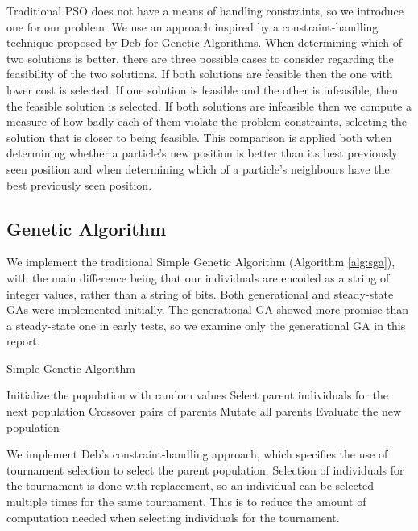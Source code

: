 \documentclass{sig-alternate}
\begin{document}
Traditional PSO does not have a means of handling constraints, so we introduce one for our problem. We use an approach inspired by a constraint-handling technique proposed by Deb for Genetic Algorithms\cite{Deb2000}. When determining which of two solutions is better, there are three possible cases to consider regarding the feasibility of the two solutions. If both solutions are feasible then the one with lower cost is selected. If one solution is feasible and the other is infeasible, then the feasible solution is selected. If both solutions are infeasible then we compute a measure of how badly each of them violate the problem constraints, selecting the solution that is closer to being feasible.
This comparison is applied both when determining whether a particle's new position is better than its best previously seen position and when determining which of a particle's neighbours have the best previously seen position.

\subsection{Genetic Algorithm}
We implement the traditional Simple Genetic Algorithm (Algorithm \ref{alg:sga}), with the main difference being that our individuals are encoded as a string of integer values, rather than a string of bits.
Both generational and steady-state GAs were implemented initially. The generational GA showed more promise than a steady-state one in early tests, so we examine only the generational GA in this report.

\begin{algorithm}
\caption{Simple Genetic Algorithm} \label{alg:sga}
\begin{algorithmic}[1]
	\State Initialize the population with random values
		\State Select parent individuals for the next population
		\State Crossover pairs of parents
		\State Mutate all parents
		\State Evaluate the new population
	\EndFor
\end{algorithmic}
\end{algorithm}

We implement Deb's constraint-handling approach\cite{Deb2000}, which specifies the use of tournament selection to select the parent population. Selection of individuals for the tournament is done with replacement, so an individual can be selected multiple times for the same tournament. This is to reduce the amount of computation needed when selecting individuals for the tournament.
\end{document}
